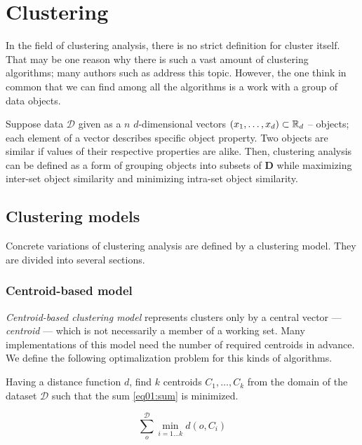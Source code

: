\chapter{Clustering}

In the field of clustering analysis, there is no strict definition for cluster itself. That may be one reason why there is such a vast amount of clustering algorithms; many authors such as \citet{estivill2002so} address this topic.  However, the one think in common that we can find among all the algorithms is a work with a group of data objects.

Suppose data $\mathcal{D}$ given as a $n$ $d$-dimensional vectors $(x_1,\dots,x_d) \subset \mathbb{R}_d$  -- objects; each element of a vector describes specific object property. Two objects are similar if values of their respective properties are alike. Then, clustering analysis can be defined as a form of grouping objects into subsets of $\mathbf{D}$ while maximizing inter-set object similarity and minimizing intra-set object similarity.

\section{Clustering models}

Concrete variations of clustering analysis are defined by a clustering model. They are divided into several sections.

\subsection{Centroid-based model}

\emph{Centroid-based clustering model} represents clusters only by a central vector --- \emph{centroid} --- which is not necessarily a member of a working set. Many implementations of this model need the number of required centroids in advance. We define the following optimalization problem for this kinds of algorithms. 

\begin{problem}
	Having a distance function $d$, find $k$ centroids $C_1,\dots,C_k$ from the domain of the dataset $\mathcal{D}$ such that the sum \ref{eq01:sum}
	is minimized.
\end{problem}

\begin{equation}\label{eq01:sum}
	\sum_o^{\mathcal{D}} \min_{i=1\dots k}d(o,C_i)
\end{equation}


